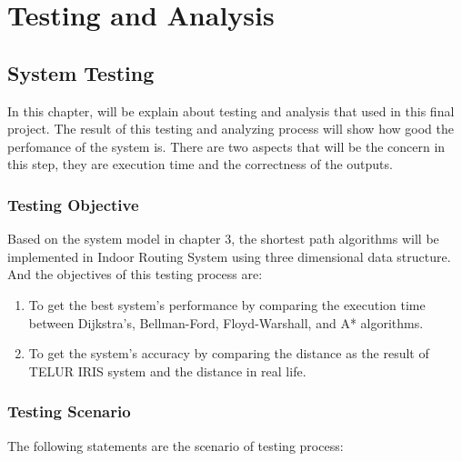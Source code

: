 \chapter{Testing and Analysis}
\section{System Testing}
In this chapter, will be explain about testing and analysis that used in this final project. The result of this testing and analyzing process will show how good the perfomance of the system is. There are two aspects that will be the concern in this step, they are execution time and the correctness of the outputs.  

\subsection{Testing Objective}
Based on the system model in chapter 3, the shortest path algorithms will be implemented in Indoor Routing System using three dimensional data structure. And the objectives of this testing process are:
\begin{enumerate}
	\item To get the best system's performance by comparing the execution time between Dijkstra's, Bellman-Ford, Floyd-Warshall, and A* algorithms.
	\item To get the system's accuracy by comparing the distance as the result of TELUR IRIS system and  the distance in real life.
\end{enumerate}

\subsection{Testing Scenario}
The following statements are the scenario of testing process:

